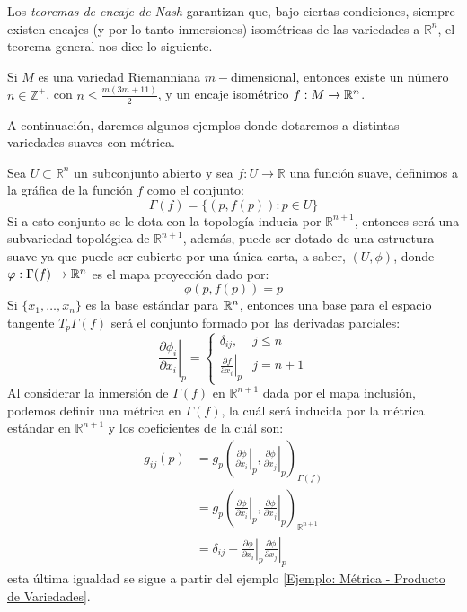 Los \textit{teoremas de encaje de Nash} garantizan que, bajo ciertas condiciones, siempre existen encajes (y por lo tanto inmersiones) isométricas de las variedades a $\mathbb{R}^{n}$, el teorema general nos dice lo siguiente.

\begin{theorem}
  Si $M$ es una variedad Riemanniana $m-$dimensional, entonces existe un número $n \in \mathbb{Z}^{+}$, con $n \leq \frac{m(3m+11)}{2}$, y un encaje isométrico $f: M \to \mathbb{R}^{n}$.
\end{theorem}

A continuación, daremos algunos ejemplos donde dotaremos a distintas variedades suaves con métrica.

\begin{example}\label{Ejemplo: Métrica - Gráfica de funciones suaves}
	Sea $U \subset \mathbb{R}^{n}$ un subconjunto abierto y sea $f: U \to \mathbb{R}$ una función suave, definimos a la gráfica de la función $f$ como el conjunto:
	\[
		\Gamma(f) = \{(p,f(p)): p \in U\}
	\]
	Si a esto conjunto se le dota con la topología inducia por $\mathbb{R}^{n+1}$, entonces será una subvariedad topológica de $\mathbb{R}^{n+1}$, además, puede ser dotado de una estructura suave ya que puede ser cubierto por una única carta, a saber, $(U,\phi)$,  donde $\varphi: \Gamma(f) \to \mathbb{R}^{n}$ es el mapa proyección dado por:
	\[
		\phi(p,f(p)) = p
	\]
	Si $\{x_{1},\ldots,x_{n}\}$ es la base estándar para $\mathbb{R}^{n}$, entonces una base para el espacio tangente $T_{p}\Gamma(f)$ será el conjunto formado por las derivadas parciales:
	\[
		\left. \frac{\partial \phi_i}{\partial x_i} \right|_{p} =
		\begin{cases}
			\delta_{ij},                                     & j \leq n \\
			\left. \frac{\partial f}{\partial x_i} \right|_p & j=n+1
		\end{cases}
	\]
	Al considerar la inmersión de $\Gamma(f)$ en $\mathbb{R}^{n+1}$ dada por el mapa inclusión, podemos definir una métrica en $\Gamma(f)$, la cuál será inducida por la métrica estándar en $\mathbb{R}^{n+1}$ y los coeficientes de la cuál son:
	\begin{align*}
		g_{ij}(p) & = g_{p} \left(
		\left. \frac{\partial \phi}{\partial x_{i}}\right|_{p},
		\left. \frac{\partial \phi}{\partial x_{j}}\right|_{p}
		\right)_{\Gamma(f)}         \\
		          & = g_{p} \left(
		\left. \frac{\partial \phi}{\partial x_{i}}\right|_{p},
		\left. \frac{\partial \phi}{\partial x_{j}}\right|_{p}
		\right)_{\mathbb{R}^{n+1}}  \\
		          & = \delta_{ij} +
		\left. \frac{\partial \phi}{\partial x_{i}}\right|_{p}
		\left. \frac{\partial \phi}{\partial x_{j}}\right|_{p}
	\end{align*}
	esta última igualdad se sigue a partir del ejemplo \ref{Ejemplo: Métrica - Producto de Variedades}.
\end{example}

